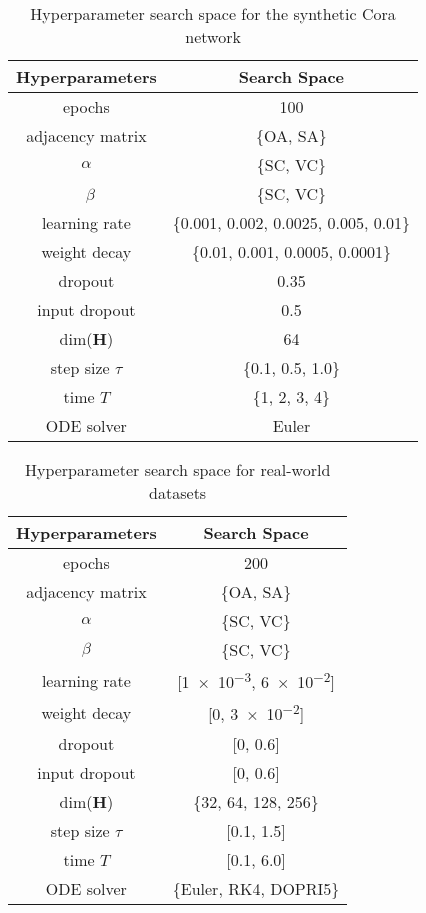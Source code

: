 \documentclass{article}
\theoremstyle{plain}
\theoremstyle{definition}
\theoremstyle{remark}
\begin{document}
\begin{table}[ht!]
    \centering
    \caption{Hyperparameter search space for the synthetic Cora network}
    \label{tab:search_homophily}
    \begin{tabular}{cc} \toprule
        Hyperparameters  &  Search Space \\ \midrule
        epochs           & 100 \\
adjacency matrix & \{OA, SA\}\\
        $\alpha$         & \{SC, VC\}\\\
        $\beta$          & \{SC, VC\}\\
        learning rate    & \{0.001, 0.002, 0.0025, 0.005, 0.01\}\\
        weight decay     & \{0.01, 0.001, 0.0005, 0.0001\}\\
        dropout          & 0.35\\
        input dropout    & 0.5\\
        dim($\mathbf{H}$)& 64\\
        step size $\tau$ & \{0.1, 0.5, 1.0\}\\
        time $T$         & \{1, 2, 3, 4\}\\
        ODE solver       & Euler\\
        \bottomrule
    \end{tabular}
\end{table}

\begin{table}[ht!]
    \centering
    \caption{Hyperparameter search space for real-world datasets}
    \label{tab:search_real}
    \begin{tabular}{cc} \toprule
        Hyperparameters  &  Search Space \\ \midrule
epochs           & 200\\
        adjacency matrix & \{OA, SA\}\\
        $\alpha$         & \{SC, VC\}\\
        $\beta$          & \{SC, VC\}\\
        learning rate    & [\num{1e-3}, \num{6e-2}]\\
        weight decay     & [\num{0}, \num{3e-2}]\\
        dropout          & [\num{0}, \num{0.6}]\\
        input dropout    & [\num{0}, \num{0.6}]\\
        dim($\mathbf{H}$)& \{32, 64, 128, 256\}\\
        step size $\tau$ & [0.1, 1.5]\\
        time $T$         & [0.1, 6.0]\\
        ODE solver       & \{Euler, RK4, DOPRI5\}\\
        \bottomrule
    \end{tabular}
\end{table}
\end{document}
